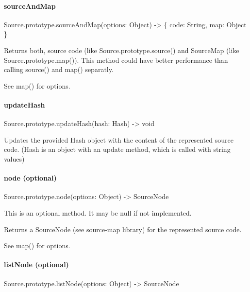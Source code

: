 \paragraph*{{\ttfamily source\+And\+Map}}


\begin{DoxyCode}
Source.prototype.sourceAndMap(options: Object) -> \{
    code: String,
    map: Object
\}
\end{DoxyCode}


Returns both, source code (like {\ttfamily Source.\+prototype.\+source()} and Source\+Map (like {\ttfamily Source.\+prototype.\+map()}). This method could have better performance than calling {\ttfamily source()} and {\ttfamily map()} separatly.

See {\ttfamily map()} for {\ttfamily options}.

\paragraph*{{\ttfamily update\+Hash}}


\begin{DoxyCode}
Source.prototype.updateHash(hash: Hash) -> void
\end{DoxyCode}


Updates the provided {\ttfamily Hash} object with the content of the represented source code. ({\ttfamily Hash} is an object with an {\ttfamily update} method, which is called with string values)

\paragraph*{{\ttfamily node} (optional)}


\begin{DoxyCode}
Source.prototype.node(options: Object) -> SourceNode
\end{DoxyCode}


This is an optional method. It may be {\ttfamily null} if not implemented.

Returns a {\ttfamily Source\+Node} (see source-\/map library) for the represented source code.

See {\ttfamily map()} for {\ttfamily options}.

\paragraph*{{\ttfamily list\+Node} (optional)}


\begin{DoxyCode}
Source.prototype.listNode(options: Object) -> SourceNode
\end{DoxyCode}


